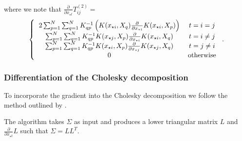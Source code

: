 where we note that $\frac{\partial}{\partial x_{\star t}} T^{(2)}_{ij} = $
\begin{equation}
    \left\{ \begin{tabular}{cc}
        $2 \sum_{p = 1}^{N} \sum_{q = 1}^{N} K^{-1}_{qp} \left( K(x_{\star i}, X_{q}) \frac{\partial}{\partial x_{\star i}} K(x_{\star i}, X_{p}) \right)$ & $t = i = j$ \\
        $\sum_{p = 1}^{N} \sum_{q = 1}^{N} K^{-1}_{qp} K(x_{\star j}, X_{p}) \frac{\partial}{\partial x_{\star i}} K(x_{\star i}, X_{q})$ & $t = i \neq j$ \\
							$\sum_{p = 1}^{N} \sum_{q = 1}^{N} K^{-1}_{qp} K(x_{\star i}, X_{p}) \frac{\partial}{\partial x_{\star j}} K(x_{\star j}, X_{q})$ & $t = j \neq i$ \\
							$0$ & otherwise
                                                      \end{tabular} \right..
\end{equation}

\subsubsection{Differentiation of the Cholesky decomposition}

To incorporate the gradient into the Cholesky decomposition we follow the method outlined by \cite{Smith1995}.

The algorithm takes $\Sigma$ as input and produces a lower triangular matrix $L$ and $\frac{\partial}{\partial x_{\star t}} L$ such that $\Sigma = LL^{T}$.

